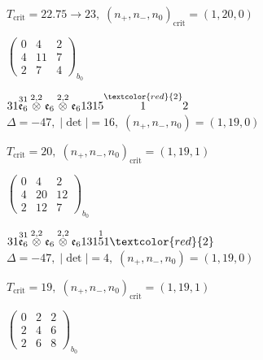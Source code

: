 \documentclass[10pt]{article}
\begin{document}
\hspace{1em}$T_{\text{crit}}=22.75 \to 23,\; (n_+,n_-,n_0)_{\text{crit}}=(1,20,0)$

\hspace{2em}$\left(\begin{smallmatrix}0 & 4 & 2 \\ 4 & 11 & 7 \\ 2 & 7 & 4\end{smallmatrix}\right)_{\!b_0}$

\smallskip

$31\overset{31}{\mathfrak{e}_6}\overset{2,2}{\otimes}\mathfrak{e}_6\overset{2,2}{\otimes}\mathfrak{e}_61315\overset{\textcolor{red}{2}}{1}2$ \quad $\Delta=-47,\; |\det|=16,\; (n_+,n_-,n_0)=(1,19,0)$

\hspace{1em}$T_{\text{crit}}=20,\; (n_+,n_-,n_0)_{\text{crit}}=(1,19,1)$

\hspace{2em}$\left(\begin{smallmatrix}0 & 4 & 2 \\ 4 & 20 & 12 \\ 2 & 12 & 7\end{smallmatrix}\right)_{\!b_0}$

\smallskip

$31\overset{31}{\mathfrak{e}_6}\overset{2,2}{\otimes}\mathfrak{e}_6\overset{2,2}{\otimes}\mathfrak{e}_6131\overset{1}{5}1\textcolor{red}{2}$ \quad $\Delta=-47,\; |\det|=4,\; (n_+,n_-,n_0)=(1,19,0)$

\hspace{1em}$T_{\text{crit}}=19,\; (n_+,n_-,n_0)_{\text{crit}}=(1,19,1)$

\hspace{2em}$\left(\begin{smallmatrix}0 & 2 & 2 \\ 2 & 4 & 6 \\ 2 & 6 & 8\end{smallmatrix}\right)_{\!b_0}$

\smallskip
\end{document}
